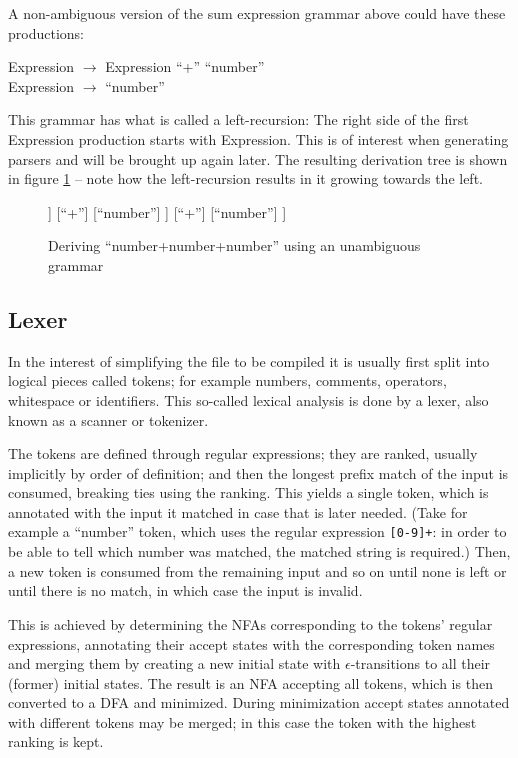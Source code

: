 			A non-ambiguous version of the sum expression grammar above could have these productions:
			
			Expression $\rightarrow$ Expression ``+'' ``number''\\
			Expression $\rightarrow$ ``number''
			
			This grammar has what is called a left-recursion: The right side of the first Expression production starts with Expression. This is of interest when generating parsers and will be brought up again later. The resulting derivation tree is shown in figure \ref{fig:derivation_tree_exp_3} -- note how the left-recursion results in it growing towards the left.
			
			\begin{figure}
			\centering
			\begin{forest}
			[Expression
				[Expression
					[Expression
						[``number'']
					]
					[``+'']
					[``number'']
				]
				[``+'']
				[``number'']
			]
			\end{forest}
			\caption{Deriving ``number+number+number'' using an unambiguous grammar}
			\label{fig:derivation_tree_exp_3}
			\end{figure}
			
		
		\subsection{Lexer}
		
			In the interest of simplifying the file to be compiled it is usually first split into logical pieces called tokens; for example numbers, comments, operators, whitespace or identifiers. This so-called lexical analysis is done by a lexer, also known as a scanner or tokenizer.
			
			The tokens are defined through regular expressions; they are ranked, usually implicitly by order of definition; and then the longest prefix match of the input is consumed, breaking ties using the ranking. This yields a single token, which is annotated with the input it matched in case that is later needed. (Take for example a ``number'' token, which uses the regular expression \lstinline$[0-9]+$: in order to be able to tell which number was matched, the matched string is required.) Then, a new token is consumed from the remaining input and so on until none is left or until there is no match, in which case the input is invalid.
			
			This is achieved by determining the NFAs corresponding to the tokens' regular expressions, annotating their accept states with the corresponding token names and merging them by creating a new initial state with $\epsilon$-transitions to all their (former) initial states. The result is an NFA accepting all tokens, which is then converted to a DFA and minimized. During minimization accept states annotated with different tokens may be merged; in this case the token with the highest ranking is kept.
			
